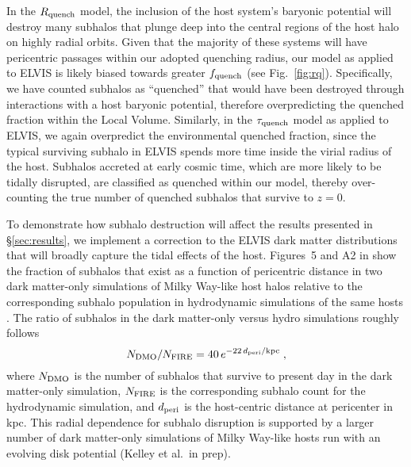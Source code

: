 %


In the $R_{\rm quench}$ model, the inclusion of the host system's baryonic
potential will destroy many subhalos that plunge deep into the central regions
of the host halo on highly radial orbits. Given that the majority of these
systems will have pericentric passages within our adopted quenching radius, our
model as applied to ELVIS is likely biased towards greater $f_{\rm quench}$ (see
Fig.~\ref{fig:rq}).
%
Specifically, we have counted subhalos as ``quenched'' that would have been
destroyed through interactions with a host baryonic potential, therefore
overpredicting the quenched fraction within the Local Volume.
%
Similarly, in the $\tau_{\rm quench}$ model as applied to ELVIS, we again
overpredict the environmental quenched fraction, since the typical surviving
subhalo in ELVIS spends more time inside the virial radius of the host. Subhalos
accreted at early cosmic time, which are more likely to be tidally disrupted,
are classified as quenched within our model, thereby over-counting the true
number of quenched subhalos that survive to $z=0$.
%



To demonstrate how subhalo destruction will affect the results presented in
\S\ref{sec:results}, we implement a correction to the ELVIS dark matter
distributions that will broadly capture the tidal effects of the host.
%
Figures~5 and A2 in \citet{gk17} show the fraction of subhalos that exist as a
function of pericentric distance in two dark matter-only simulations of Milky
Way-like host halos relative to the corresponding subhalo population in
hydrodynamic simulations of the same hosts \citep[using the FIRE model for star
formation and feedback,][]{wetzel16, hopkins14, hopkins17}.
%
The ratio of subhalos in the dark matter-only versus hydro simulations roughly
follows
%
\begin{equation}
  N_{\rm DMO} / N_{\rm FIRE} =  40 \, e^{-22 \, d_{\rm peri}/{\rm kpc}} \; ,
\label{eqn:destruct}
\end{equation}
%
where $N_ {\rm DMO}$ is the number of subhalos that survive to present day in
the dark matter-only simulation, $N_ {\rm FIRE}$ is the corresponding subhalo
count for the hydrodynamic simulation, and $d_{\rm peri}$ is the host-centric
distance at pericenter in kpc.
%
This radial dependence for subhalo disruption is supported by a larger number of
dark matter-only simulations of Milky Way-like hosts run with an evolving disk
potential (Kelley et al.~in prep).


